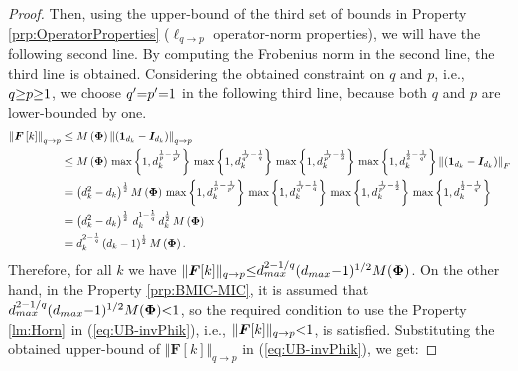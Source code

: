 \begin{proof}
Then, using the upper-bound of the third set of bounds in Property \ref{prp:OperatorProperties} ($\ell_{q {\to} p}$ operator-norm properties), we will have the following second line.
By computing the Frobenius norm in the second line, the third line is obtained.
Considering the obtained constraint on $q$ and $p$, i.e., $q {\geq} p {\geq} 1$, we choose $q' {=} p' {=} 1$ in the following third line, because both $q$ and $p$ are lower-bounded by one.
\begin{gather*}
\begin{aligned}
\left\lVert\boldsymbol{F} \left[ k \right]\right\rVert_{q \to p} &\leq 
M\left( \boldsymbol{\Phi} \right) \left\lVert\left( \boldsymbol{1}_{d_k} - \boldsymbol{I}_{d_k} \right)\right\rVert_{q \to p} \\
&\leq M\left( \boldsymbol{\Phi} \right) \, \max \left\lbrace 1 , d_k^{\frac1p - \frac{1}{p'}} \right\rbrace \, \max \left\lbrace 1 , d_k^{\frac{1}{q'} - \frac1q} \right\rbrace \, \max \left\lbrace 1 , d_k^{\frac{1}{p'} -\frac12} \right\rbrace \, \max \left\lbrace 1 , d_k^{\frac{1}{2} - \frac{1}{q'}} \right\rbrace \left\lVert\left( \boldsymbol{1}_{d_k} - \boldsymbol{I}_{d_k} \right)\right\rVert_F \\
&= \left( d_k^2 - d_k \right)^\frac12 M\left( \boldsymbol{\Phi} \right) \, \max \left\lbrace 1 , d_k^{\frac1p - \frac{1}{p'}} \right\rbrace \, \max \left\lbrace 1 , d_k^{\frac{1}{q'} - \frac1q} \right\rbrace \, \max \left\lbrace 1 , d_k^{\frac{1}{p'} -\frac12} \right\rbrace \, \max \left\lbrace 1 , d_k^{\frac{1}{2} - \frac{1}{q'}} \right\rbrace \\
&= \left( d_k^2 - d_k \right)^\frac12 \, d_k^{1 - \frac1q} \, d_k^{\frac12} \, M\left( \boldsymbol{\Phi} \right)\\
&= d_k^{2 - \frac1q} \left( d_k - 1 \right)^\frac12 M\left( \boldsymbol{\Phi} \right).
\end{aligned}
\end{gather*}
Therefore, for all $k$ we have $\Vert\boldsymbol{F}[k] \Vert_{q \to p} {\leq} d_{max}^{2 - 1/q} (d_{max} {-} 1)^{1/2} M(\boldsymbol{\Phi})$.
On the other hand, in the Property \ref{prp:BMIC-MIC}, it is assumed that $d_{max}^{2 - 1/q} (d_{max} {-} 1)^{1/2} M(\boldsymbol{\Phi}) {<} 1$, so the required condition to use the Property \ref{lm:Horn} in (\ref{eq:UB-invPhik}), i.e., $\Vert\boldsymbol{F}[k] \Vert_{q \to p} {<} 1$, 
is satisfied.
Substituting the obtained upper-bound of $\Vert\boldsymbol{F}[k] \Vert_{q \to p}$ in (\ref{eq:UB-invPhik}), we get:


\end{proof}
